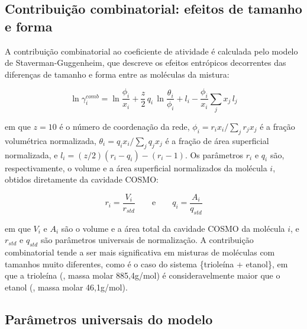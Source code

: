 \subsection{Contribuição combinatorial: efeitos de tamanho e forma}
\label{subsec:cosmo_combinatorial}

A contribuição combinatorial ao coeficiente de atividade é calculada pelo modelo de Staverman-Guggenheim, que descreve os efeitos entrópicos decorrentes das diferenças de tamanho e forma entre as moléculas da mistura\cite{lin2002}:

\begin{equation}
    \ln \gamma_i^{comb} =
    \ln \frac{\phi_i}{x_i}
    + \frac{z}{2} \, q_i \, \ln \frac{\theta_i}{\phi_i}
    + l_i
    - \frac{\phi_i}{x_i} \sum_{j} x_j \, l_j
    \label{eq:gamma_combinatorial}
\end{equation}

\noindent em que $z = 10$ é o número de coordenação da rede, $\phi_i = r_i x_i / \sum_j r_j x_j$ é a fração volumétrica normalizada, $\theta_i = q_i x_i / \sum_j q_j x_j$ é a fração de área superficial normalizada, e $l_i = (z/2)(r_i - q_i) - (r_i - 1)$. Os parâmetros $r_i$ e $q_i$ são, respectivamente, o volume e a área superficial normalizados da molécula $i$, obtidos diretamente da cavidade COSMO\cite{lin2002}:

\begin{equation}
    r_i = \frac{V_i}{r_{std}} \qquad \text{e} \qquad
    q_i = \frac{A_i}{q_{std}}
    \label{eq:ri_qi}
\end{equation}

\noindent em que $V_i$ e $A_i$ são o volume e a área total da cavidade COSMO da molécula $i$, e $r_{std}$ e $q_{std}$ são parâmetros universais de normalização. A contribuição combinatorial tende a ser mais significativa em misturas de moléculas com tamanhos muito diferentes, como é o caso do sistema \{trioleína + etanol\}, em que a trioleína (, massa molar 885,4g/mol) é consideravelmente maior que o etanol (, massa molar 46,1g/mol).


\subsection{Parâmetros universais do modelo}
\label{subsec:cosmo_parametros}


